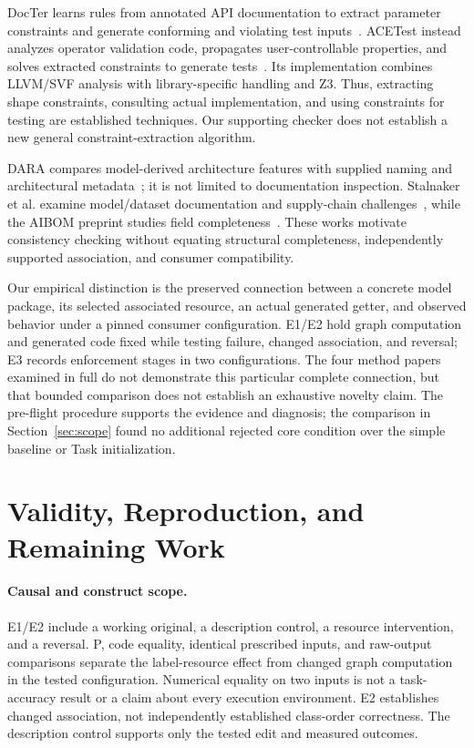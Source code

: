 \documentclass[10pt,twocolumn,letterpaper]{article}
\begin{document}
DocTer learns rules from annotated API documentation to extract parameter constraints and generate conforming and violating test inputs~\cite{docter}. ACETest instead analyzes operator validation code, propagates user-controllable properties, and solves extracted constraints to generate tests~\cite{acetest}. Its implementation combines LLVM/SVF analysis with library-specific handling and Z3. Thus, extracting shape constraints, consulting actual implementation, and using constraints for testing are established techniques. Our supporting checker does not establish a new general constraint-extraction algorithm.

DARA compares model-derived architecture features with supplied naming and architectural metadata~\cite{dara}; it is not limited to documentation inspection. Stalnaker et al. examine model/dataset documentation and supply-chain challenges~\cite{stalnaker}, while the AIBOM preprint studies field completeness~\cite{aibom}. These works motivate consistency checking without equating structural completeness, independently supported association, and consumer compatibility.

Our empirical distinction is the preserved connection between a concrete model package, its selected associated resource, an actual generated getter, and observed behavior under a pinned consumer configuration. E1/E2 hold graph computation and generated code fixed while testing failure, changed association, and reversal; E3 records enforcement stages in two configurations. The four method papers examined in full do not demonstrate this particular complete connection, but that bounded comparison does not establish an exhaustive novelty claim. The pre-flight procedure supports the evidence and diagnosis; the comparison in Section~\ref{sec:scope} found no additional rejected core condition over the simple baseline or Task initialization.

\section{Validity, Reproduction, and Remaining Work}
\paragraph{Causal and construct scope.}
E1/E2 include a working original, a description control, a resource intervention, and a reversal. P, code equality, identical prescribed inputs, and raw-output comparisons separate the label-resource effect from changed graph computation in the tested configuration. Numerical equality on two inputs is not a task-accuracy result or a claim about every execution environment. E2 establishes changed association, not independently established class-order correctness. The description control supports only the tested edit and measured outcomes.
\end{document}

